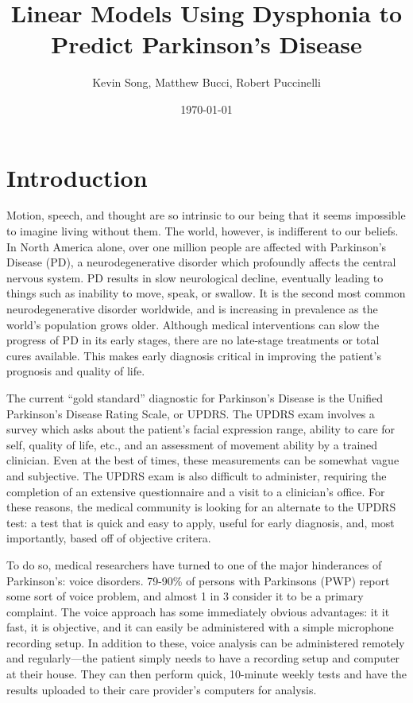 \documentclass{report}
\title{Linear Models Using Dysphonia to Predict Parkinson's Disease}
\author{Kevin Song, Matthew Bucci, Robert Puccinelli}
\date{\today}
\begin{document}
\maketitle

\section*{Introduction}

Motion, speech, and thought are so intrinsic to our being that it seems impossible to imagine living without them. The world, however, is indifferent to our beliefs.
In North America alone, over one million people are affected with Parkinson's Disease (PD), a neurodegenerative disorder which profoundly affects the central nervous system.
PD results in slow neurological decline, eventually leading to things such as inability to move, speak, or swallow. It is the second most common neurodegenerative disorder worldwide, 
and is increasing in prevalence as the world's population grows older. Although medical interventions 
can slow the progress of PD in its early stages, there are no late-stage treatments or total cures available. 
This makes early diagnosis critical in improving the patient's prognosis and quality of life.

The current ``gold standard'' diagnostic for Parkinson's Disease is the Unified Parkinson's Disease Rating Scale, or UPDRS. The UPDRS exam involves a survey 
which asks about the patient's facial expression range, ability to care for self, quality of life, etc., and an assessment of movement ability by a trained
clinician. Even at the best of times, these measurements can be somewhat vague and subjective. The UPDRS exam is also difficult to administer, requiring the
completion of an extensive questionnaire and a visit to a clinician's office. For these reasons, the medical community is looking for an alternate to the UPDRS test: a test
that is quick and easy to apply, useful for early diagnosis, and, most importantly, based off of objective critera.

To do so, medical researchers have turned to one of the major hinderances of Parkinson's: voice disorders. 79-90\% of persons with Parkinsons (PWP) report some sort of
voice problem, and almost 1 in 3 consider it to be a primary complaint. The voice approach has some immediately obvious advantages: it it fast, it is objective, and it
can easily be administered with a simple microphone recording setup. In addition to these, voice analysis can be administered remotely and regularly---the patient simply 
needs to have a recording setup and computer at their house. They can then perform quick, 10-minute weekly tests and have the results uploaded to their care provider's 
computers for analysis.
\end{document}
